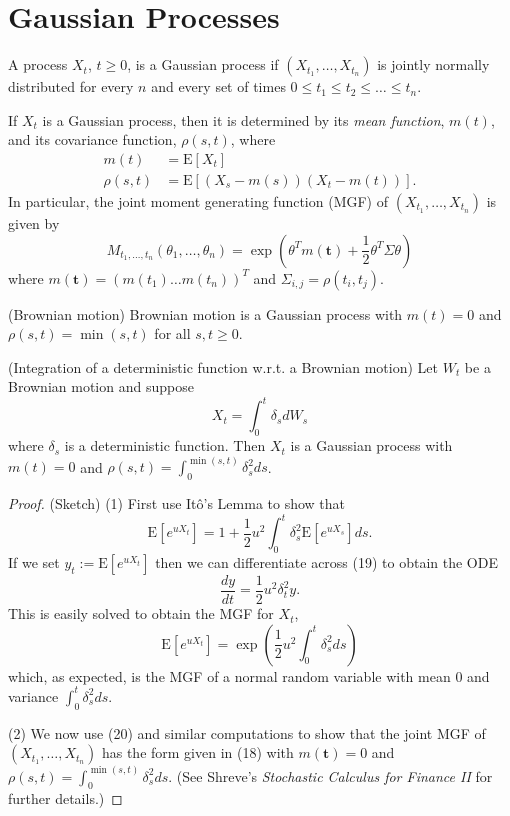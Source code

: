 \section{Gaussian Processes}
\begin{definition}
A process $X_t$, $t\geq 0$, is a Gaussian process if $(X_{t_1},\ldots,X_{t_n})$ is jointly normally distributed for every $n$ and every set of times $0\leq t_1\leq t_2\leq\ldots\leq t_n$.
\end{definition}
If $X_t$ is a Gaussian process, then it is determined by its \textit{mean function}, $m(t)$, and its covariance function, $\rho(s,t)$, where
\begin{align*}
m(t) &= \mathrm{E}[X_t] \\
\rho(s,t) &= \mathrm{E}[(X_s-m(s))(X_t-m(t))].
\end{align*}
In particular, the joint moment generating function (MGF) of $(X_{t_1},\ldots,X_{t_n})$ is given by
\[M_{t_1,\ldots,t_n}(\theta_1,\ldots,\theta_n) = \exp\left(\theta^T m(\mathbf{t}) + \frac{1}{2} \theta^T \Sigma \theta\right) \tag{18}\]
where $m(\mathbf{t})=(m(t_1) \ldots m(t_n))^T$ and $\Sigma_{i,j}=\rho(t_i,t_j)$.

\begin{example} (Brownian motion)
Brownian motion is a Gaussian process with $m(t)=0$ and $\rho(s,t)=\min(s,t)$ for all $s,t\geq 0$.
\end{example}

\begin{theorem} (Integration of a deterministic function w.r.t. a Brownian motion)
Let $W_t$ be a Brownian motion and suppose
\[X_t = \int_0^t \delta_s dW_s\]
where $\delta_s$ is a deterministic function. Then $X_t$ is a Gaussian process with $m(t)=0$ and $\rho(s,t)=\int_0^{\min(s,t)} \delta_s^2 ds$.
\end{theorem}

\begin{proof} (Sketch)
(1) First use It\^o's Lemma to show that
\[\mathrm{E}\left[e^{uX_t}\right] = 1 + \frac{1}{2}u^2 \int_0^t \delta_s^2 \mathrm{E}\left[e^{uX_s}\right] ds. \tag{19}\]
If we set $y_t:=\mathrm{E}\left[e^{uX_t}\right]$ then we can differentiate across (19) to obtain the ODE
\[\frac{dy}{dt} = \frac{1}{2}u^2 \delta_t^2 y.\]
This is easily solved to obtain the MGF for $X_t$,
\[\mathrm{E}\left[e^{uX_t}\right] = \exp\left(\frac{1}{2}u^2 \int_0^t \delta_s^2 ds\right) \tag{20}\]
which, as expected, is the MGF of a normal random variable with mean $0$ and variance $\int_0^t \delta_s^2 ds$.

(2) We now use (20) and similar computations to show that the joint MGF of $(X_{t_1},\ldots,X_{t_n})$ has the form given in (18) with $m(\mathbf{t})=0$ and $\rho(s,t)=\int_0^{\min(s,t)} \delta_s^2 ds$. (See Shreve's \textit{Stochastic Calculus for Finance II} for further details.)
\end{proof}

